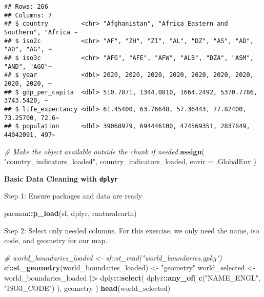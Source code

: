 \documentclass[
]{article}
\newenvironment{Shaded}{\begin{snugshade}}{\end{snugshade}}
\newcommand{\AttributeTok}[1]{\textcolor[rgb]{0.13,0.29,0.53}{#1}}
\newcommand{\CommentTok}[1]{\textcolor[rgb]{0.56,0.35,0.01}{\textit{#1}}}
\newcommand{\FunctionTok}[1]{\textcolor[rgb]{0.13,0.29,0.53}{\textbf{#1}}}
\newcommand{\NormalTok}[1]{#1}
\newcommand{\OtherTok}[1]{\textcolor[rgb]{0.56,0.35,0.01}{#1}}
\newcommand{\SpecialCharTok}[1]{\textcolor[rgb]{0.81,0.36,0.00}{\textbf{#1}}}
\newcommand{\StringTok}[1]{\textcolor[rgb]{0.31,0.60,0.02}{#1}}
\begin{document}
\begin{verbatim}
## Rows: 266
## Columns: 7
## $ country         <chr> "Afghanistan", "Africa Eastern and Southern", "Africa ~
## $ iso2c           <chr> "AF", "ZH", "ZI", "AL", "DZ", "AS", "AD", "AO", "AG", ~
## $ iso3c           <chr> "AFG", "AFE", "AFW", "ALB", "DZA", "ASM", "AND", "AGO"~
## $ year            <dbl> 2020, 2020, 2020, 2020, 2020, 2020, 2020, 2020, 2020, ~
## $ gdp_per_capita  <dbl> 510.7871, 1344.0810, 1664.2492, 5370.7786, 3743.5420, ~
## $ life_expectancy <dbl> 61.45400, 63.76648, 57.36443, 77.82400, 73.25700, 72.6~
## $ population      <dbl> 39068979, 694446100, 474569351, 2837849, 44042091, 497~
\end{verbatim}

\begin{Shaded}
\begin{Highlighting}[]
\CommentTok{\# Make the object available outside the chunk if needed}
\FunctionTok{assign}\NormalTok{(}
  \StringTok{"country\_indicators\_loaded"}\NormalTok{,}
\NormalTok{  country\_indicators\_loaded,}
  \AttributeTok{envir =}\NormalTok{ .GlobalEnv}
\NormalTok{)}
\end{Highlighting}
\end{Shaded}

\textbf{Basic Data Cleaning with \texttt{dplyr}}

Step 1: Ensure packages and data are ready

\begin{Shaded}
\begin{Highlighting}[]
\NormalTok{pacman}\SpecialCharTok{::}\FunctionTok{p\_load}\NormalTok{(sf, dplyr, rnaturalearth)}
\end{Highlighting}
\end{Shaded}

Step 2: Select only needed columns. For this exercise, we only need the
name, iso code, and geometry for our map.

\begin{Shaded}
\begin{Highlighting}[]
\CommentTok{\# world\_boundaries\_loaded \textless{}{-} sf::st\_read("world\_boundaries.gpkg")}
\NormalTok{sf}\SpecialCharTok{::}\FunctionTok{st\_geometry}\NormalTok{(world\_boundaries\_loaded) }\OtherTok{\textless{}{-}} \StringTok{"geometry"}
\NormalTok{world\_selected }\OtherTok{\textless{}{-}}\NormalTok{ world\_boundaries\_loaded }\SpecialCharTok{|\textgreater{}} 
\NormalTok{  dplyr}\SpecialCharTok{::}\FunctionTok{select}\NormalTok{(}
\NormalTok{    dplyr}\SpecialCharTok{::}\FunctionTok{any\_of}\NormalTok{(}
      \FunctionTok{c}\NormalTok{(}\StringTok{"NAME\_ENGL"}\NormalTok{, }\StringTok{"ISO3\_CODE"}\NormalTok{)}
\NormalTok{    ), geometry}
\NormalTok{  )}
\FunctionTok{head}\NormalTok{(world\_selected)}
\end{Highlighting}
\end{Shaded}
\end{document}

